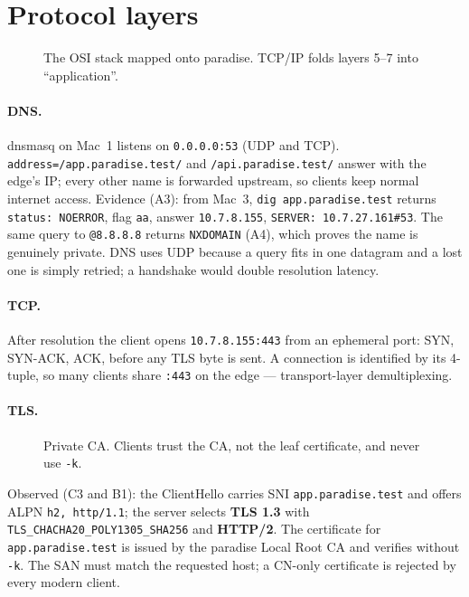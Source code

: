 \documentclass[11pt,a4paper]{article}
\begin{document}
\section{Protocol layers}

\begin{figure}[H]
\centering
\drawOsi
\caption{The OSI stack mapped onto paradise. TCP/IP folds layers 5--7 into ``application''.}
\end{figure}

\paragraph{DNS.}
dnsmasq on Mac~1 listens on \texttt{0.0.0.0:53} (UDP and TCP). \texttt{address=/app.paradise.test/}
and \texttt{/api.paradise.test/} answer with the edge's IP; every other name is forwarded
upstream, so clients keep normal internet access. Evidence (A3): from Mac~3,
\texttt{dig app.paradise.test} returns \texttt{status: NOERROR}, flag \texttt{aa}, answer
\texttt{10.7.8.155}, \texttt{SERVER: 10.7.27.161\#53}. The same query to \texttt{@8.8.8.8} returns
\texttt{NXDOMAIN} (A4), which proves the name is genuinely private.
DNS uses UDP because a query fits in one datagram and a lost one is simply retried; a handshake
would double resolution latency.

\paragraph{TCP.}
After resolution the client opens \texttt{10.7.8.155:443} from an ephemeral port:
SYN, SYN-ACK, ACK, before any TLS byte is sent. A connection is identified by its 4-tuple,
so many clients share \texttt{:443} on the edge --- transport-layer demultiplexing.

\paragraph{TLS.}
\begin{figure}[H]
\centering
\drawTls
\caption{Private CA. Clients trust the CA, not the leaf certificate, and never use \texttt{-k}.}
\end{figure}

Observed (C3 and B1): the ClientHello carries SNI \texttt{app.paradise.test} and offers ALPN
\texttt{h2, http/1.1}; the server selects \textbf{TLS 1.3} with
\texttt{TLS\_CHACHA20\_POLY1305\_SHA256} and \textbf{HTTP/2}. The certificate for
\texttt{app.paradise.test} is issued by the paradise Local Root CA and verifies without \texttt{-k}.
The SAN must match the requested host; a CN-only certificate is rejected by every modern client.
\end{document}
